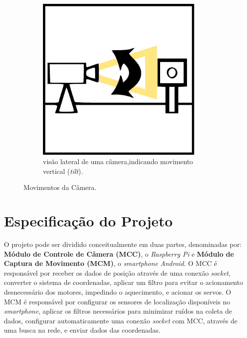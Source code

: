 \begin{figure}[H]
\begin{subfigure}{.5\textwidth}
		\includegraphics[width=0.90\textwidth]{figuras/Tilt1.pdf}
		\caption{visão lateral de uma câmera,\newline indicando movimento vertical (\textit{tilt}).}
		\label{fig:cameramotion_tilt}
	\end{subfigure}
	\caption{Movimentos da Câmera.}
	\label{fig:cameramotion}
\end{figure}

\section{Especificação do Projeto}
\label{sec:especificacao}

O projeto pode ser dividido conceitualmente em duas partes, denominadas por: \textbf{Módulo de Controle de Câmera (MCC)}, o \textit{Raspberry Pi} e \textbf{Módulo de Captura de Movimento (MCM)}, o \textit{smartphone} \textit{Android}. O MCC é responsável por receber os dados de posição através de uma conexão \textit{socket}, converter o sistema de coordenadas, aplicar um filtro para evitar o acionamento desnecessário dos motores, impedindo o aquecimento, e acionar os servos. O MCM é responsável por configurar os sensores de localização disponíveis no \textit{smartphone}, aplicar os filtros necessários para minimizar ruídos na coleta de dados, configurar automaticamente uma conexão \textit{socket} com MCC, através de uma busca na rede, e enviar dados das coordenadas. \par

